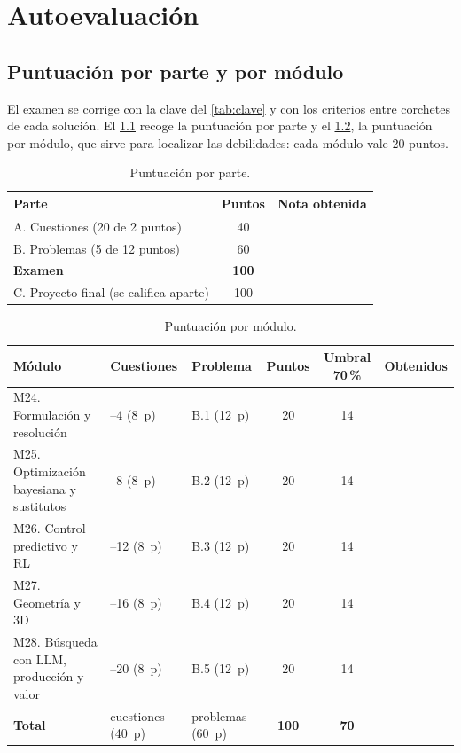 \chapter{Autoevaluación}
\label{ap:autoevaluacion}

\section{Puntuación por parte y por módulo}

El examen se corrige con la clave del \cref{tab:clave} y con los criterios entre corchetes de cada solución. El \cref{tab:puntos-parte} recoge la puntuación por parte y el \cref{tab:puntos-modulo}, la puntuación por módulo, que sirve para localizar las debilidades: cada módulo vale 20 puntos.

\begin{table}[h]
\centering\small
\caption{Puntuación por parte.}\label{tab:puntos-parte}
\begin{tabular}{@{}lcc@{}}
\toprule
Parte & Puntos & Nota obtenida \\
\midrule
A. Cuestiones (20 de 2 puntos) & 40 & \\
B. Problemas (5 de 12 puntos) & 60 & \\
\midrule
\textbf{Examen} & \textbf{100} & \\
\midrule
C. Proyecto final (se califica aparte) & 100 & \\
\bottomrule
\end{tabular}
\end{table}

\begin{table}[h]
\centering\small
\caption{Puntuación por módulo.}\label{tab:puntos-modulo}
\begin{tabularx}{\textwidth}{@{}>{\raggedright\arraybackslash}X>{\raggedright\arraybackslash}p{2.6cm}>{\raggedright\arraybackslash}p{2.2cm}ccc@{}}
\toprule
Módulo & Cuestiones & Problema & Puntos & Umbral 70\,\% & Obtenidos \\
\midrule
M24. Formulación y resolución & 1--4 (8~p) & B.1 (12~p) & 20 & 14 & \\
M25. Optimización bayesiana y sustitutos & 5--8 (8~p) & B.2 (12~p) & 20 & 14 & \\
M26. Control predictivo y RL & 9--12 (8~p) & B.3 (12~p) & 20 & 14 & \\
M27. Geometría y 3D & 13--16 (8~p) & B.4 (12~p) & 20 & 14 & \\
M28. Búsqueda con LLM, producción y valor & 17--20 (8~p) & B.5 (12~p) & 20 & 14 & \\
\midrule
\textbf{Total} & 20 cuestiones (40~p) & 5 problemas (60~p) & \textbf{100} & \textbf{70} & \\
\bottomrule
\end{tabularx}
\end{table}

